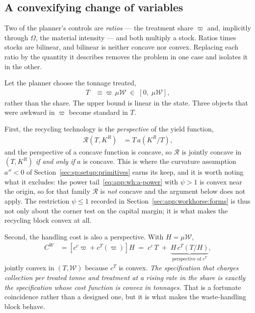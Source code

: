\subsection{A convexifying change of variables}\label{sec:app:suff:convexify}

Two of the planner's controls are \emph{ratios} --- the treatment share $\varpi$ and, implicitly through $\Omega$, the material intensity --- and both multiply a stock. Ratios times stocks are bilinear, and bilinear is neither concave nor convex. Replacing each ratio by the quantity it describes removes the problem in one case and isolates it in the other.

 Let the planner choose the tonnage treated,
\begin{align}
T &\equiv \varpi\,\mu\mathcal W \;\in\;\left[0,\;\mu\mathcal W\right],
\label{eq:app:suff:Tdef}
\end{align}
rather than the share. The upper bound is linear in the state. Three objects that were awkward in $\varpi$ become standard in $T$.

First, the recycling technology is the \emph{perspective} of the yield function,
\begin{align}
\mathcal R\left(T,K^R\right) &= T\,a\!\left(K^R/T\right),
\label{eq:app:suff:persp-R}
\end{align}
and the perspective of a concave function is concave, so $\mathcal R$ is jointly concave in $\left(T,K^R\right)$ \emph{if and only if} $a$ is concave. This is where the curvature assumption $a''<0$ of Section~\ref{sec:sp:setup:primitives} earns its keep, and it is worth noting what it excludes: the power tail~\eqref{eq:app:wh:a-power} with $\psi>1$ is convex near the origin, so for that family $\mathcal R$ is \emph{not} concave and the argument below does not apply. The restriction $\psi\le1$ recorded in Section~\ref{sec:app:workhorse:forms} is thus not only about the corner test on the capital margin; it is what makes the recycling block convex at all.

Second, the handling cost is also a perspective. With $H=\mu\mathcal W$,
\begin{align}
C^W &= \left[c^c\varpi+c^T\!\left(\varpi\right)\right]H
\;=\; c^c\,T \;+\; \underbrace{H\,c^T\!\left(T/H\right)}_{\text{perspective of }c^T},
\label{eq:app:suff:persp-cW}
\end{align}
jointly convex in $\left(T,\mathcal W\right)$ because $c^T$ is convex. \emph{The specification that charges collection per treated tonne and treatment at a rising rate in the share is exactly the specification whose cost function is convex in tonnages.} That is a fortunate coincidence rather than a designed one, but it is what makes the waste-handling block behave.

